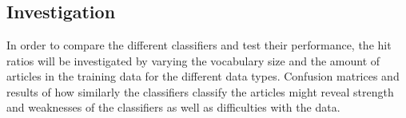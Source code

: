 \subsubsection{\mn\ \nb} %
\label{ssub:multinomial}

\subsubsection{\rf} %
\label{ssub:random_forest}

\subsubsection{\svm} %
\label{ssub:support_vector_machine}

\subsubsection{\hy} %
\label{ssub:hybrid}


\subsection{Investigation}
In order to compare the different classifiers and test their performance, the hit ratios will be investigated by varying the vocabulary size and the amount of articles in the training data for the different data types. Confusion matrices and results of how similarly the classifiers classify the articles might reveal strength and weaknesses of the classifiers as well as difficulties with the data.